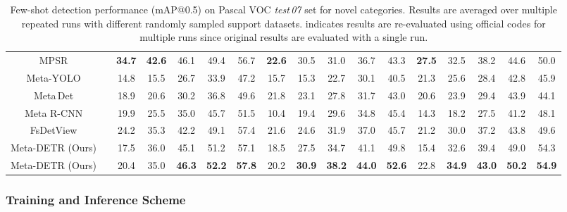 \documentclass[10pt,twocolumn,letterpaper]{article}
\begin{document}
\begin{table*}[t]
\begin{center}
{\begin{tabular}[t]{cc|ccccc|ccccc|ccccc}
MPSR\;\cite{MPSR}  &  & \textbf{34.7} & \textbf{42.6} & 46.1 & 49.4 & 56.7 & \textbf{22.6} & 30.5 & 31.0 & 36.7 & 43.3 & \textbf{27.5} & 32.5 & 38.2 & 44.6 & 50.0 \\

Meta-YOLO\;\cite{FewshotReweighting} & & 14.8 & 15.5 & 26.7 & 33.9 & 47.2 & 15.7 & 15.3 & 22.7 & 30.1 & 40.5 & 21.3 & 25.6 & 28.4 & 42.8 & 45.9 \\

Meta\,Det\;\cite{metadet} && 18.9 & 20.6 & 30.2 & 36.8 & 49.6 & 21.8 & 23.1 & 27.8 & 31.7 & 43.0 & 20.6 & 23.9 & 29.4 & 43.9 & 44.1\\

Meta R-CNN\;\cite{metarcnn} & & 19.9 & 25.5 & 35.0 & 45.7 & 51.5 & 10.4 & 19.4 & 29.6 & 34.8 & 45.4 & 14.3 & 18.2 & 27.5 & 41.2 & 48.1 \\

FsDetView\;\cite{FSDetView} & & 24.2 & 35.3 & 42.2 & 49.1 & 57.4 & 21.6 & 24.6 & 31.9 & 37.0 & 45.7 & 21.2 & 30.0 & 37.2 & 43.8 & 49.6 \\

\rowcolor{black!6} Meta-DETR (Ours) & & 17.5 & 36.0 & 45.1 & 51.2 & 57.1 & 18.5 & 27.5 & 34.7 & 41.1 & 49.8 & 15.4 & 32.6 & 39.4 & 49.0 & 54.3 \\

\rowcolor{black!6} Meta-DETR (Ours) &  & 20.4 & 35.0 & \textbf{46.3} & \textbf{52.2} & \textbf{57.8} & 20.2 & \textbf{30.9} & \textbf{38.2} & \textbf{44.0} & \textbf{52.6} & 22.8 & \textbf{34.9} & \textbf{43.0} & \textbf{50.2} & \textbf{54.9} \\

\bottomrule[1pt]
\end{tabular}}
\end{center}
\vspace*{-1.25mm}
\caption{Few-shot detection performance (mAP@0.5) on Pascal VOC \textit{test\,07} set for novel categories. Results are averaged over multiple repeated runs with different randomly sampled support datasets.  indicates results are re-evaluated using official codes for multiple runs since original results are evaluated with a single run.}
\label{tab:Performance_VOC_novel}
\vspace*{-1.25mm}
\end{table*}



\subsubsection{Training and Inference Scheme}
\end{document}

